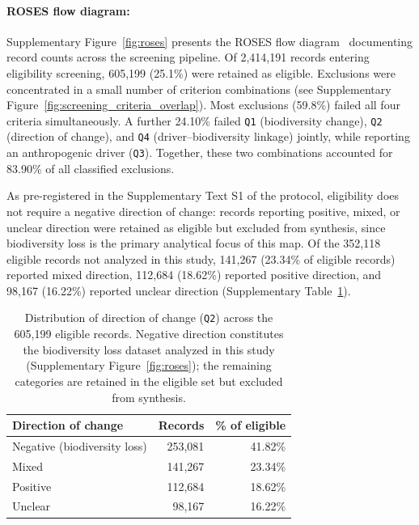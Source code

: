 \documentclass[12pt]{article}
\renewcommand{\arraystretch}{1.2}
\begin{document}
\paragraph*{ROSES flow diagram:}
Supplementary Figure~\ref{fig:roses} presents the ROSES flow diagram~\cite{Haddaway2017ROSES} documenting record counts across the screening pipeline. Of 2{,}414{,}191 records entering eligibility screening, 605{,}199 (25.1\%) were retained as eligible. Exclusions were concentrated in a small number of criterion combinations (see Supplementary Figure~\ref{fig:screening_criteria_overlap}). Most exclusions (59.8\%) failed all four criteria simultaneously. A further 24.10\% failed \texttt{Q1} (biodiversity change), \texttt{Q2} (direction of change), and \texttt{Q4} (driver--biodiversity linkage) jointly, while reporting an anthropogenic driver (\texttt{Q3}). Together, these two combinations accounted for 83.90\% of all classified exclusions.

As pre-registered in the Supplementary Text S1 of the protocol, eligibility does not require a negative direction of change: records reporting positive, mixed, or unclear direction were retained as eligible but excluded from synthesis, since biodiversity loss is the primary analytical focus of this map. Of the 352{,}118 eligible records not analyzed in this study, 141{,}267 (23.34\% of eligible records) reported mixed direction, 112{,}684 (18.62\%) reported positive direction, and 98{,}167 (16.22\%) reported unclear direction (Supplementary Table~\ref{tab:direction_breakdown}).

\begin{table}[H]
\renewcommand{\arraystretch}{1.3}
\centering
\small
\begin{tabular}{|l|r|r|}
\hline
\textbf{Direction of change} & \textbf{Records} & \textbf{\% of eligible} \\
\hline
Negative (biodiversity loss) & 253{,}081 & 41.82\% \\
\hline
Mixed & 141{,}267 & 23.34\% \\
\hline
Positive & 112{,}684 & 18.62\% \\
\hline
Unclear & 98{,}167 & 16.22\% \\
\hline
\end{tabular}
\caption{Distribution of direction of change (\texttt{Q2}) across the 605{,}199 eligible records. Negative direction constitutes the biodiversity loss dataset analyzed in this study (Supplementary Figure~\ref{fig:roses}); the remaining categories are retained in the eligible set but excluded from synthesis.}
\label{tab:direction_breakdown}
\end{table}
\end{document}
